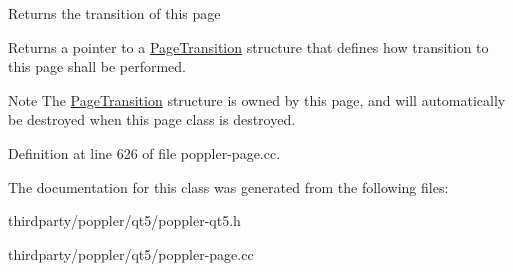 Returns the transition of this page

\begin{DoxyReturn}{Returns}
a pointer to a \hyperlink{class_poppler_1_1_page_transition}{Page\+Transition} structure that defines how transition to this page shall be performed.
\end{DoxyReturn}
\begin{DoxyNote}{Note}
The \hyperlink{class_poppler_1_1_page_transition}{Page\+Transition} structure is owned by this page, and will automatically be destroyed when this page class is destroyed. 
\end{DoxyNote}


Definition at line 626 of file poppler-\/page.\+cc.



The documentation for this class was generated from the following files\+:\begin{DoxyCompactItemize}
\item 
thirdparty/poppler/qt5/poppler-\/qt5.\+h\item 
thirdparty/poppler/qt5/poppler-\/page.\+cc\end{DoxyCompactItemize}
